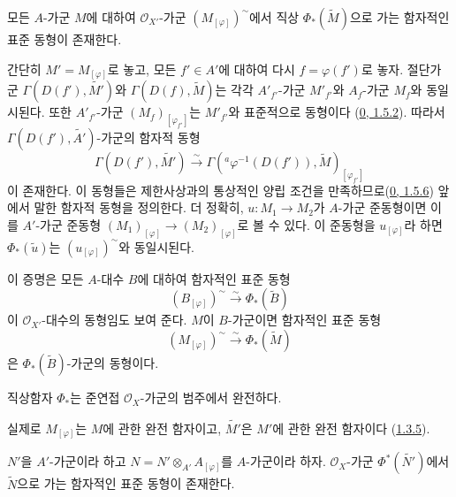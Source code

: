 \begin{proposition}[1.6.3]
\label{I.1.6.3-ko}
모든 $A$-가군 $M$에 대하여 $\mathscr{O}_{X'}$-가군
$(M_{[\varphi]})^{\sim}$에서 직상 $\Phi_*(\widetilde{M})$으로 가는
함자적인 표준 동형이 존재한다.
\end{proposition}

간단히 $M'=M_{[\varphi]}$로 놓고, 모든 $f'\in A'$에 대하여 다시
$f=\varphi(f')$로 놓자. 절단가군
$\Gamma(D(f'),\widetilde{M'})$와
$\Gamma(D(f),\widetilde{M})$는 각각 $A'_{f'}$-가군 $M'_{f'}$와
$A_f$-가군 $M_f$와 동일시된다. 또한 $A'_{f'}$-가군
$(M_f)_{[\varphi_{f'}]}$는 $M'_{f'}$와 표준적으로 동형이다
(\hyperref[0.1.5.2-ko]{0, 1.5.2}). 따라서
$\Gamma(D(f'),\widetilde{A'})$-가군의 함자적 동형
\[
  \Gamma(D(f'),\widetilde{M'})\xrightarrow{\sim}
  \Gamma({}^a\varphi^{-1}(D(f')),\widetilde{M})_{[\varphi_{f'}]}
\]
이 존재한다. 이 동형들은 제한사상과의 통상적인 양립 조건을
만족하므로(\hyperref[0.1.5.6-ko]{0, 1.5.6}) 앞에서 말한 함자적 동형을
정의한다. 더 정확히, $u:M_1\to M_2$가 $A$-가군 준동형이면 이를
$A'$-가군 준동형
$(M_1)_{[\varphi]}\to(M_2)_{[\varphi]}$로 볼 수 있다. 이 준동형을
$u_{[\varphi]}$라 하면 $\Phi_*(\widetilde{u})$는
$(u_{[\varphi]})^{\sim}$와 동일시된다.

이 증명은 모든 $A$-대수 $B$에 대하여 함자적인 표준 동형
\[
  (B_{[\varphi]})^{\sim}\xrightarrow{\sim}\Phi_*(\widetilde{B})
\]
이 $\mathscr{O}_{X'}$-대수의 동형임도 보여 준다. $M$이
$B$-가군이면 함자적인 표준 동형
\[
  (M_{[\varphi]})^{\sim}\xrightarrow{\sim}\Phi_*(\widetilde{M})
\]
은 $\Phi_*(\widetilde{B})$-가군의 동형이다.

\begin{corollary}[1.6.4]
\label{I.1.6.4-ko}
직상함자 $\Phi_*$는 준연접 $\mathscr{O}_X$-가군의 범주에서
완전하다.
\end{corollary}

실제로 $M_{[\varphi]}$는 $M$에 관한 완전 함자이고,
$\widetilde{M'}$은 $M'$에 관한 완전 함자이다
(\hyperref[I.1.3.5-ko]{1.3.5}).

\begin{proposition}[1.6.5]
\label{I.1.6.5-ko}
$N'$을 $A'$-가군이라 하고 $N=N'\otimes_{A'}A_{[\varphi]}$를
$A$-가군이라 하자. $\mathscr{O}_X$-가군
$\Phi^*(\widetilde{N'})$에서 $\widetilde{N}$으로 가는 함자적인
표준 동형이 존재한다.
\end{proposition}


